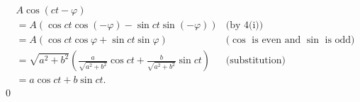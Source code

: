\documentclass[oneside]{article}
\begin{document}
  \begin{align*}
    &A \cos(ct - \varphi) \\
    &= A(\cos ct\cos(-\varphi)-\sin ct\sin(-\varphi))
      &\text{(by 4(i))} \\
    &= A(\cos ct\cos\varphi + \sin ct\sin\varphi)
      &\text{($\cos$ is even and $\sin$ is odd)} \\
    &= \sqrt{a^2+b^2}(\frac{a}{\sqrt{a^2+b^2}}\cos ct
        + \frac{b}{\sqrt{a^2+b^2}}\sin ct)
      &\text{(substitution)}\\
    &= a\cos ct + b\sin ct \text{.}
  \end{align*} \qed
\end{document}
